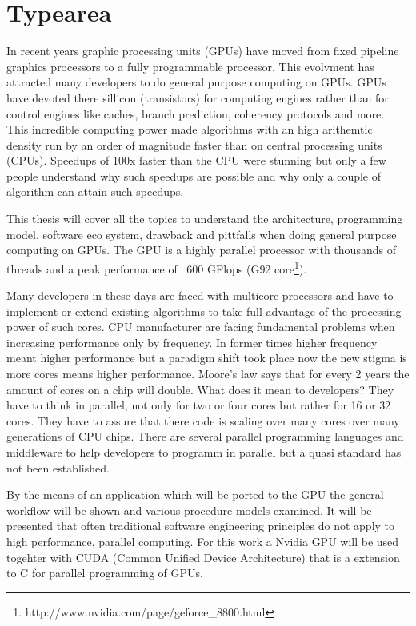 \chapter{Typearea}

In recent years graphic processing units (GPUs) have moved from fixed pipeline
graphics processors to a fully programmable processor. This evolvment has
attracted many developers to do general purpose computing on GPUs. GPUs have
devoted there sillicon (transistors) for computing engines rather than for
control engines like caches, branch prediction, coherency protocols and more.
This incredible computing power made algorithms with an high arithemtic density
run by an order of magnitude faster than on central processing units (CPUs).
Speedups of 100x faster than the CPU were stunning but only a few people
understand why such speedups are possible and why only a couple of algorithm can
attain such speedups.

This thesis will cover all the topics to understand the architecture,
programming model, software eco system, drawback and pittfalls when doing
general purpose computing on GPUs. The \gls{GPU} is a highly parallel processor with
thousands of threads and a peak performance of ~600 GFlops (G92
core\footnote{http://www.nvidia.com/page/geforce\_8800.html}).

Many developers in these days are faced with multicore processors and have to
implement or extend existing algorithms to take full advantage of the
processing power of such cores. CPU manufacturer are facing fundamental problems
when increasing performance only by frequency. In former times higher frequency
meant higher performance but a paradigm shift took place now the new stigma is
more cores means higher performance. Moore's law says that for every 2 years the
amount of cores on a chip will double. What does it mean to developers? They
have to think in parallel, not only for two or four cores but rather for 16 or
32 cores. They have to assure that there code is scaling over many cores over
many generations of CPU chips. There are several parallel programming languages
and middleware to help developers to programm in parallel but a quasi standard
has not been established.

By the means of an application which will be ported to the \gls{GPU} the general
workflow will be shown and various procedure models examined. It will be
presented that often traditional software engineering principles do not
apply to high performance, parallel computing. For this work a Nvidia \gls{GPU} will
be used togehter with CUDA (Common Unified Device Architecture) that is a
extension to C for parallel programming of GPUs. 

